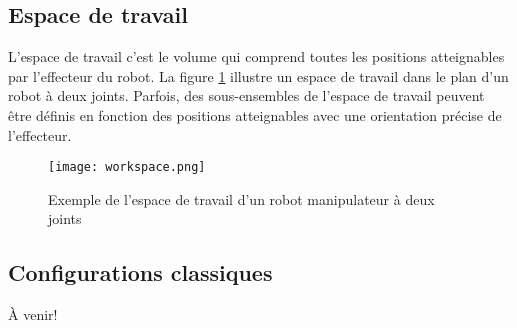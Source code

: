 \subsection{Espace de travail}

L'espace de travail c'est le volume qui comprend toutes les positions atteignables par l'effecteur du robot. La figure \ref{fig:workspace} illustre un espace de travail dans le plan d'un robot à deux joints. Parfois, des sous-ensembles de l'espace de travail peuvent être définis en fonction des positions atteignables avec une orientation précise de l'effecteur.

\begin{figure}[H]
	\centering
		\texttt{[image: workspace.png]}
	\caption{Exemple de l'espace de travail d'un robot manipulateur à deux joints}
	\label{fig:workspace}
\end{figure}







\subsection{Configurations classiques}  

À venir!


